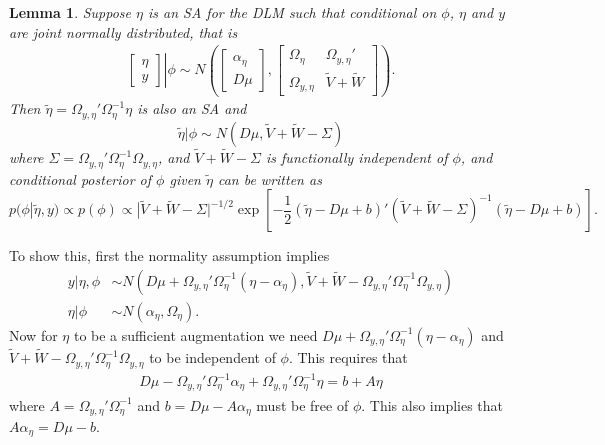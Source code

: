 \documentclass{article}
\newtheorem{lem}[thm]{Lemma}
\begin{document}
\begin{lem}\label{noSA}
Suppose $\eta$ is an SA for the DLM such that conditional on $\phi$, $\eta$ and $y$ are joint normally distributed, that is 
\begin{align*}
 \left. \begin{bmatrix}\eta \\ y \end{bmatrix}\right|\phi \sim N\left(\begin{bmatrix} \alpha_\eta \\ D\mu \end{bmatrix}, \begin{bmatrix} 
   \Omega_\eta & \Omega_{y,\eta}' \\
   \Omega_{y,\eta} & \tilde{V} + \tilde{W} \end{bmatrix}\right).
\end{align*}
Then $\tilde{\eta}=\Omega_{y,\eta}'\Omega_{\eta}^{-1}\eta$ is also an SA and
\[
\tilde{\eta}|\phi \sim N(D\mu,\tilde{V} + \tilde{W} - \Sigma)
\]
where $\Sigma=\Omega_{y,\eta}'\Omega_{\eta}^{-1}\Omega_{y,\eta}$, and $\tilde{V} + \tilde{W} - \Sigma$ is functionally independent of $\phi$, and conditional posterior of $\phi$ given $\tilde{\eta}$ can be written as
\[
p(\phi|\tilde{\eta},y) \propto p(\phi)\propto |\tilde{V} + \tilde{W} - \Sigma|^{-1/2}\exp\left[-\frac{1}{2}(\tilde{\eta} - D\mu + b)'(\tilde{V} + \tilde{W} - \Sigma)^{-1}(\tilde{\eta} - D\mu + b)\right].
\]
\end{lem}
To show this, first the normality assumption implies
\begin{align*}
  y|\eta,\phi &\sim N(D\mu + \Omega_{y,\eta}'\Omega_\eta^{-1}(\eta - \alpha_\eta), \tilde{V} + \tilde{W} - \Omega_{y,\eta}'\Omega_{\eta}^{-1}\Omega_{y,\eta})\\
  \eta|\phi &\sim N(\alpha_\eta, \Omega_\eta).
\end{align*}
Now for $\eta$ to be a sufficient augmentation we need $D\mu + \Omega_{y,\eta}'\Omega_\eta^{-1}(\eta - \alpha_\eta)$ and $\tilde{V} + \tilde{W} - \Omega_{y,\eta}'\Omega_{\eta}^{-1}\Omega_{y,\eta}$
to be independent of $\phi$. This requires that
\begin{align*}
  D\mu - \Omega_{y,\eta}'\Omega_\eta^{-1}\alpha_\eta + \Omega_{y,\eta}'\Omega_\eta^{-1}\eta  = b + A\eta
\end{align*}
where $A=\Omega_{y,\eta}'\Omega_\eta^{-1}$ and $b=D\mu - A\alpha_\eta$ must be free of $\phi$. This also implies that $A\alpha_\eta = D\mu - b$.
\end{document}
